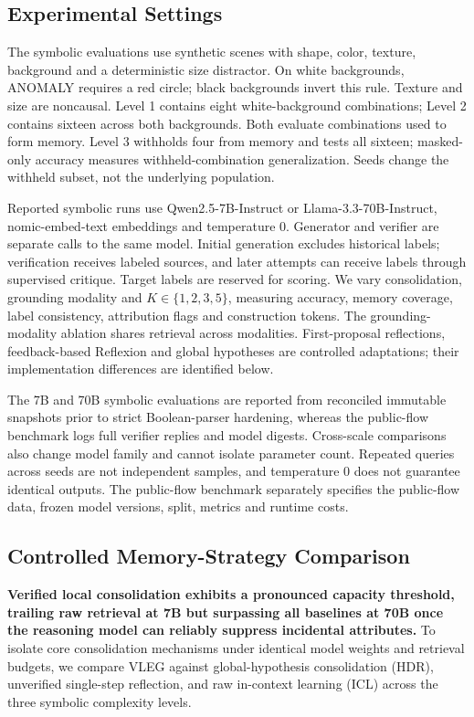 \documentclass[journal]{IEEEtran}
\theoremstyle{definition}
\theoremstyle{remark}
\begin{document}
\subsection{Experimental Settings}
The symbolic evaluations use synthetic scenes with shape, color, texture, background and a deterministic size distractor. On white backgrounds, ANOMALY requires a red circle; black backgrounds invert this rule. Texture and size are noncausal. Level 1 contains eight white-background combinations; Level 2 contains sixteen across both backgrounds. Both evaluate combinations used to form memory. Level 3 withholds four from memory and tests all sixteen; masked-only accuracy measures withheld-combination generalization. Seeds change the withheld subset, not the underlying population.

Reported symbolic runs use Qwen2.5-7B-Instruct or Llama-3.3-70B-Instruct, nomic-embed-text embeddings and temperature $0$. Generator and verifier are separate calls to the same model. Initial generation excludes historical labels; verification receives labeled sources, and later attempts can receive labels through supervised critique. Target labels are reserved for scoring. We vary consolidation, grounding modality and $K\in\{1,2,3,5\}$, measuring accuracy, memory coverage, label consistency, attribution flags and construction tokens. The grounding-modality ablation shares retrieval across modalities. First-proposal reflections, feedback-based Reflexion and global hypotheses are controlled adaptations; their implementation differences are identified below.

The 7B and 70B symbolic evaluations are reported from reconciled immutable snapshots prior to strict Boolean-parser hardening, whereas the public-flow benchmark logs full verifier replies and model digests. Cross-scale comparisons also change model family and cannot isolate parameter count. Repeated queries across seeds are not independent samples, and temperature $0$ does not guarantee identical outputs. The public-flow benchmark separately specifies the public-flow data, frozen model versions, split, metrics and runtime costs.

\subsection{Controlled Memory-Strategy Comparison}
\label{sec:exp1}

\textbf{Verified local consolidation exhibits a pronounced capacity threshold, trailing raw retrieval at 7B but surpassing all baselines at 70B once the reasoning model can reliably suppress incidental attributes.} To isolate core consolidation mechanisms under identical model weights and retrieval budgets, we compare VLEG against global-hypothesis consolidation (HDR), unverified single-step reflection, and raw in-context learning (ICL) across the three symbolic complexity levels.
\end{document}
